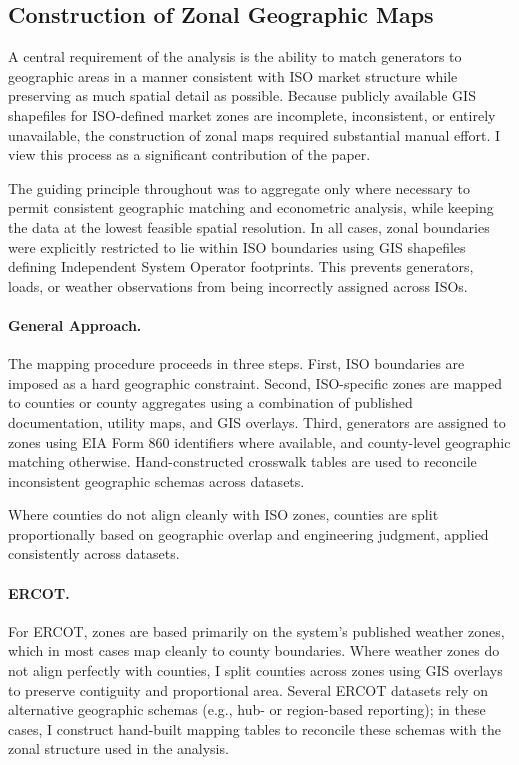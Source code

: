 \documentclass[sigconf]{acmart}
\begin{document}
\subsection{Construction of Zonal Geographic Maps}\label{zonalMappingEfforts}


A central requirement of the analysis is the ability to match generators to geographic areas in a manner consistent with ISO market structure while preserving as much spatial detail as possible. Because publicly available GIS shapefiles for ISO-defined market zones are incomplete, inconsistent, or entirely unavailable, the construction of zonal maps required substantial manual effort. I view this process as a significant contribution of the paper.

The guiding principle throughout was to aggregate only where necessary to permit consistent geographic matching and econometric analysis, while keeping the data at the lowest feasible spatial resolution. In all cases, zonal boundaries were explicitly restricted to lie within ISO boundaries using GIS shapefiles defining Independent System Operator footprints. This prevents generators, loads, or weather observations from being incorrectly assigned across ISOs.

\paragraph{General Approach.}
The mapping procedure proceeds in three steps. First, ISO boundaries are imposed as a hard geographic constraint. Second, ISO-specific zones are mapped to counties or county aggregates using a combination of published documentation, utility maps, and GIS overlays. Third, generators are assigned to zones using EIA Form 860 identifiers where available, and county-level geographic matching otherwise. Hand-constructed crosswalk tables are used to reconcile inconsistent geographic schemas across datasets.

Where counties do not align cleanly with ISO zones, counties are split proportionally based on geographic overlap and engineering judgment, applied consistently across datasets.

\paragraph{ERCOT.}
For ERCOT, zones are based primarily on the system’s published weather zones, which in most cases map cleanly to county boundaries. Where weather zones do not align perfectly with counties, I split counties across zones using GIS overlays to preserve contiguity and proportional area. Several ERCOT datasets rely on alternative geographic schemas (e.g., hub- or region-based reporting); in these cases, I construct hand-built mapping tables to reconcile these schemas with the zonal structure used in the analysis.
\end{document}
